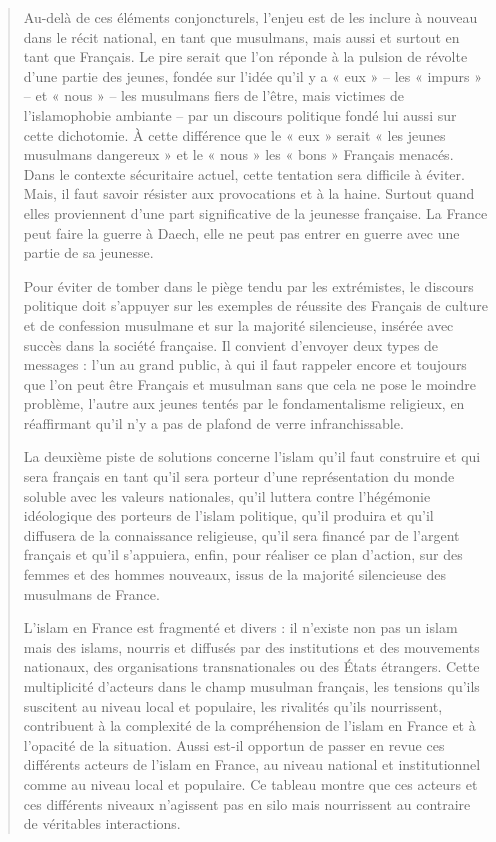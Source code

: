 \begin{quote}
Au-delà de ces éléments conjoncturels, l'enjeu est de les inclure à
nouveau dans le récit national, en tant que musulmans, mais aussi et
surtout en tant que Français. Le pire serait que l'on réponde à la
pulsion de révolte d'une partie des jeunes, fondée sur l'idée qu'il y a
« eux » -- les « impurs » -- et « nous » -- les musulmans fiers de
l'être, mais victimes de l'islamophobie ambiante -- par un discours
politique fondé lui aussi sur cette dichotomie. À cette différence que
le « eux » serait « les jeunes musulmans dangereux » et le « nous » les
« bons » Français menacés. Dans le contexte sécuritaire actuel, cette
tentation sera difficile à éviter. Mais, il faut savoir résister aux
provocations et à la haine. Surtout quand elles proviennent d'une part
significative de la jeunesse française. La France peut faire la guerre à
Daech, elle ne peut pas entrer en guerre avec une partie de sa jeunesse.

Pour éviter de tomber dans le piège tendu par les extrémistes, le
discours politique doit s'appuyer sur les exemples de réussite des
Français de culture et de confession musulmane et sur la majorité
silencieuse, insérée avec succès dans la société française. Il convient
d'envoyer deux types de messages : l'un au grand public, à qui il faut
rappeler encore et toujours que l'on peut être Français et musulman sans
que cela ne pose le moindre problème, l'autre aux jeunes tentés par le
fondamentalisme religieux, en réaffirmant qu'il n'y a pas de plafond de
verre infranchissable.

La deuxième piste de solutions concerne l'islam qu'il faut construire et
qui sera français en tant qu'il sera porteur d'une représentation du
monde soluble avec les valeurs nationales, qu'il luttera contre
l'hégémonie idéologique des porteurs de l'islam politique, qu'il
produira et qu'il diffusera de la connaissance religieuse, qu'il sera
financé par de l'argent français et qu'il s'appuiera, enfin, pour
réaliser ce plan d'action, sur des femmes et des hommes nouveaux, issus
de la majorité silencieuse des musulmans de France.

L'islam en France est fragmenté et divers : il n'existe non pas un islam
mais des islams, nourris et diffusés par des institutions et des
mouvements nationaux, des organisations transnationales ou des États
étrangers. Cette multiplicité d'acteurs dans le champ musulman français,
les tensions qu'ils suscitent au niveau local et populaire, les
rivalités qu'ils nourrissent, contribuent à la complexité de la
compréhension de l'islam en France et à l'opacité de la situation. Aussi
est-il opportun de passer en revue ces différents acteurs de l'islam en
France, au niveau national et institutionnel comme au niveau local et
populaire. Ce tableau montre que ces acteurs et ces différents niveaux
n'agissent pas en silo mais nourrissent au contraire de véritables
interactions.
\end{quote}

